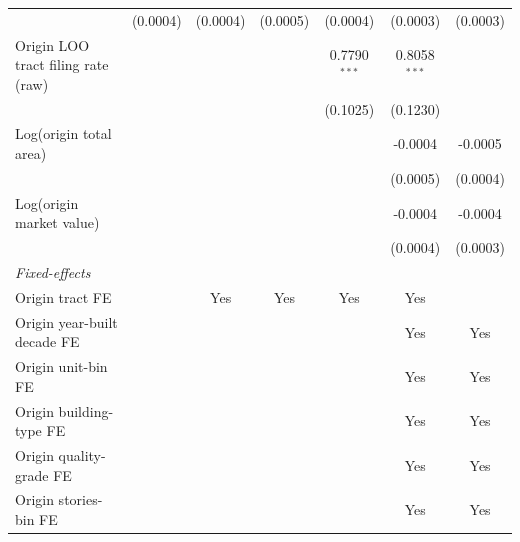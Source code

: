 \begin{tabular}{lcccccc}
                                                  & (0.0004)               & (0.0004)       & (0.0005)              & (0.0004)       & (0.0003)       & (0.0003)\\   
   Origin LOO tract filing rate (raw)             &                        &                &                       & 0.7790$^{***}$ & 0.8058$^{***}$ &   \\   
                                                  &                        &                &                       & (0.1025)       & (0.1230)       &   \\   
   Log(origin total area)                         &                        &                &                       &                & -0.0004        & -0.0005\\   
                                                  &                        &                &                       &                & (0.0005)       & (0.0004)\\   
   Log(origin market value)                       &                        &                &                       &                & -0.0004        & -0.0004\\   
                                                  &                        &                &                       &                & (0.0004)       & (0.0003)\\   
   \midrule
   \emph{Fixed-effects}\\
   Origin tract FE                                &                        & Yes            & Yes                   & Yes            & Yes            & \\  
   Origin year-built decade FE                    &                        &                &                       &                & Yes            & Yes\\  
   Origin unit-bin FE                             &                        &                &                       &                & Yes            & Yes\\  
   Origin building-type FE                        &                        &                &                       &                & Yes            & Yes\\  
   Origin quality-grade FE                        &                        &                &                       &                & Yes            & Yes\\  
   Origin stories-bin FE                          &                        &                &                       &                & Yes            & Yes\\  

\end{tabular}
